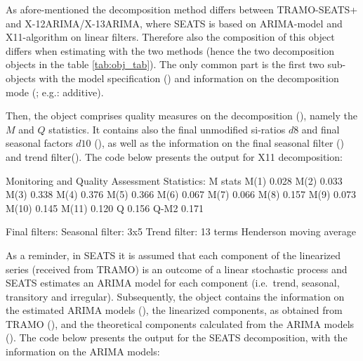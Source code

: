 \documentclass[article]{jss}
\begin{document}
As afore-mentioned the decomposition method differs between TRAMO-SEATS+
and X-12ARIMA/X-13ARIMA, where SEATS is based on ARIMA-model and
X11-algorithm on linear filters. Therefore also the composition of this
object differs when estimating with the two methods (hence the two
decomposition objects in the table \ref{tab:obj_tab}). The only common
part is the first two sub-objects with the model specification
() and information on the decomposition mode
(; e.g.: additive).

Then, the  object comprises quality measures on
the decomposition (), namely the \(M\) and \(Q\)
statistics. It contains also the final unmodified si-ratios \(d8\) and
final seasonal factors \(d10\) (), as well as the
information on the final seasonal filter () and trend
filter(). The code below presents the output for X11
decomposition:

\begin{CodeChunk}


\begin{CodeOutput}
Monitoring and Quality Assessment Statistics: 
      M stats
M(1)    0.028
M(2)    0.033
M(3)    0.338
M(4)    0.376
M(5)    0.366
M(6)    0.067
M(7)    0.066
M(8)    0.157
M(9)    0.073
M(10)   0.145
M(11)   0.120
Q       0.156
Q-M2    0.171

Final filters: 
Seasonal filter:  3x5
Trend filter:  13 terms Henderson moving average
\end{CodeOutput}
\end{CodeChunk}

As a reminder, in SEATS it is assumed that each component of the
linearized series (received from TRAMO) is an outcome of a linear
stochastic process and SEATS estimates an ARIMA model for each component
(i.e.~trend, seasonal, transitory and irregular). Subsequently, the
 object contains the information on the
estimated ARIMA models (), the linearized components, as
obtained from TRAMO (), and the theoretical components
calculated from the ARIMA models (). The code below
presents the output for the SEATS decomposition, with the information on
the ARIMA models:
\end{document}
